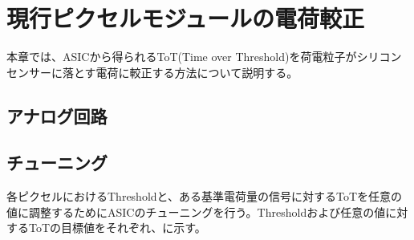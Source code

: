\chapter{現行ピクセルモジュールの電荷較正}
\label{sec:chap3}

本章では、ASICから得られるToT(Time over Threshold)を荷電粒子がシリコンセンサーに落とす電荷に較正する方法について説明する。

\section{アナログ回路}
\label{sec:analog}


\section{チューニング}
\label{sec:tuning}
各ピクセルにおけるThresholdと、ある基準電荷量の信号に対するToTを任意の値に調整するためにASICのチューニングを行う。Thresholdおよび任意の値に対するToTの目標値をそれぞれ、に示す。

